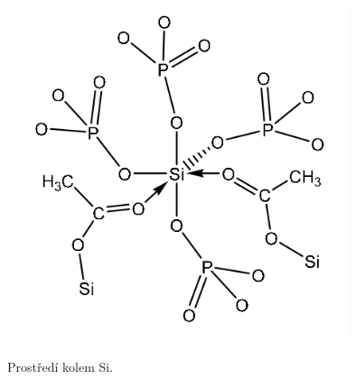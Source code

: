 \documentclass[
  digital, %
  table,   %
  lof,     %
  lot,     %
]{fithesis3}
\begin{document}
\begin{otherlanguage}{czech}
  \begin{figure}[h!]
\caption{Prostředí kolem Si. \cite{Styskalik2015thesis} }
  \center
  \includegraphics[width=10cm]{si_koordinovany_6_C.png}
  \label{si_koordinovany_6_C}
  \end{figure}
\end{otherlanguage}
\end{document}
